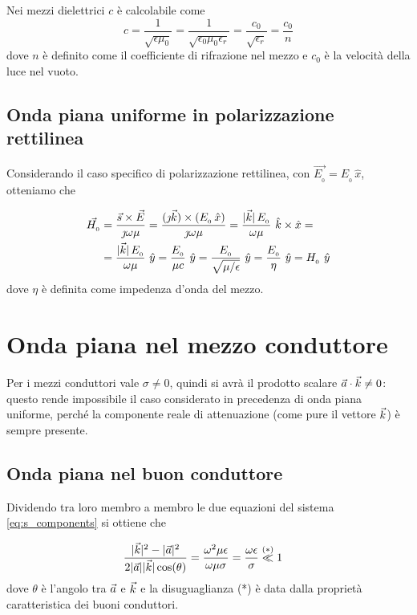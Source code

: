 		Nei mezzi dielettrici $c$ è calcolabile come
		\begin{equation*}
				c = \frac{1}{\sqrt{\epsilon \mu_0}} = \frac{1}{\sqrt{\epsilon_0 \mu_0 \epsilon_r}} = \frac{c_0}{\sqrt{\epsilon_r}} = \frac{c_0}{n}
		\end{equation*}
		dove $n$ è definito come il coefficiente di rifrazione nel mezzo e $c_0$ è la velocità della luce nel vuoto.

	\subsection{Onda piana uniforme in polarizzazione rettilinea}
		Considerando il caso specifico di polarizzazione rettilinea, con $\vec{E_{_{0}}} = E_{_{0}} \, \hat{x}$, otteniamo che

		\begin{equation*} \begin{split}
			\vec{H_{_{0}}} &= \frac{\vec{s} \times \vec{E}} {\jmath \omega \mu}
				= \frac{(\jmath \vec{k}) \times (E_{_{0}} \, \hat{x})}{\jmath \omega \mu}
				= \frac{|\vec{k}| \, E_{_{0}}}{\omega \mu} ~ \hat{k} \times \hat{x} = \\
			& = \frac{|\vec{k}| \, E_{_{0}}}{\omega \mu} ~ \hat{y}
				= \frac{E_{_{0}}}{\mu c} ~ \hat{y}
				= \frac{E_{_{0}}}{\sqrt{\mu / \epsilon}} ~ \hat{y}
				= \frac{E_{_{0}}}{\eta} ~ \hat{y}
				= H_{_{0}} ~ \hat{y}
		\end{split} \end{equation*}
		dove $\eta$ è definita come impedenza d'onda del mezzo.

\section{Onda piana nel mezzo conduttore}
	Per i mezzi conduttori vale $\sigma \neq 0$, quindi si avrà il prodotto scalare $\vec{a} \cdot \vec{k} \neq 0$: questo rende impossibile il caso considerato in precedenza di onda piana uniforme, perché la componente reale di attenuazione (come pure il vettore $\vec{k}$) è sempre presente.

	\subsection{Onda piana nel buon conduttore} \label{sec:onda_piana_conduttore}
		Dividendo tra loro membro a membro le due equazioni del sistema \eqref{eq:s_components} si ottiene che

		\begin{equation*} \begin{split}
			& \frac{|\vec{k}|^2 - |\vec{a}|^2}{2 |\vec{a}| |\vec{k}| \cos(\theta)}
				= \frac{\omega^2 \mu \epsilon}{\omega \mu \sigma}
				= \frac{\omega \epsilon}{\sigma} \stackrel{(*)}{\ll} 1
		\end{split} \end{equation*}
		dove $\theta$ è l'angolo tra $\vec{a}$ e $\vec{k}$ e la disuguaglianza (*) è data dalla proprietà caratteristica dei buoni conduttori.

